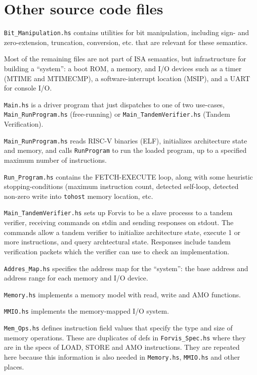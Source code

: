 \documentclass[11pt]{article}
\begin{document}

\section{Other source code files}

\label{sec_misc}

\verb|Bit_Manipulation.hs| contains utilities for bit manipulation,
including sign- and zero-extension, truncation, conversion, etc. that
are relevant for these semantics.

Most of the remaining files are not part of ISA semantics, but
infrastructure for building a ``system'': a boot ROM, a memory, and
I/O devices such as a timer (MTIME and MTIMECMP), a software-interrupt
location (MSIP), and a UART for console I/O.

\verb|Main.hs| is a driver program that just dispatches to one of two
use-cases, \verb|Main_RunProgram.hs| (free-running) or
\verb|Main_TandemVerifier.hs| (Tandem Verification).

\verb|Main_RunProgram.hs| reads RISC-V binaries (ELF), initializes
architecture state and memory, and calls \verb|RunProgram| to run the
loaded program, up to a specified maximum number of instructions.

\verb|Run_Program.hs| contains the FETCH-EXECUTE loop, along with some
heuristic stopping-conditions (maximum instruction count, detected
self-loop, detected non-zero write into \verb|tohost| memory location,
etc.

\verb|Main_TandemVerifier.hs| sets up Forvis to be a slave processs to
a tandem verifier, receiving commands on stdin and sending responses
on stdout.  The commands allow a tandem verifier to initialize
architecture state, execute 1 or more instructions, and query
archtectural state. Responses include tandem verification packets
which the verifier can use to check an implementation.

\verb|Addres_Map.hs| specifies the address map for the ``system'': the
base address and address range for each memory and I/O device.

\verb|Memory.hs| implements a memory model with read, write and AMO
functions.

\verb|MMIO.hs| implements the memory-mapped I/O system.

\verb|Mem_Ops.hs| defines instruction field values that specify the
type and size of memory operations.  These are duplicates of defs in
\verb|Forvis_Spec.hs| where they are in the specs of LOAD, STORE and
AMO instructions.  They are repeated here because this information is
also needed in \verb|Memory.hs|, \verb|MMIO.hs| and other places.
\end{document}
